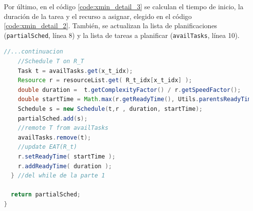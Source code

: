 Por último, en el código \ref{code:xmin_detail_3} se calculan el tiempo de inicio, la duración de la tarea y el recurso a asignar, elegido en el código \ref{code:xmin_detail_2}. También, se actualizan la lista de planificaciones (\texttt{partialSched}, línea 8) y la lista de tareas a planificar (\texttt{availTasks}, línea 10).

\begin{lstlisting}[language=java,label={code:xmin_detail_3},caption={Método de MaxMin/MinMin que planifica las tareas (parte 3)},float]
    //...continuacion
    //Schedule T on R_T
    Task t = availTasks.get(x_t_idx);
    Resource r = resourceList.get( R_t_idx[x_t_idx] );
    double duration =  t.getComplexityFactor() / r.getSpeedFactor();
    double startTime = Math.max(r.getReadyTime(), Utils.parentsReadyTime(t, partialSched, w));
    Schedule s = new Schedule(t,r , duration, startTime);
    partialSched.add(s);
    //remote T from availTasks
    availTasks.remove(t);
    //update EAT(R_t)
    r.setReadyTime( startTime );
    r.addReadyTime( duration );
  } //del while de la parte 1

  return partialSched;
}
\end{lstlisting}

